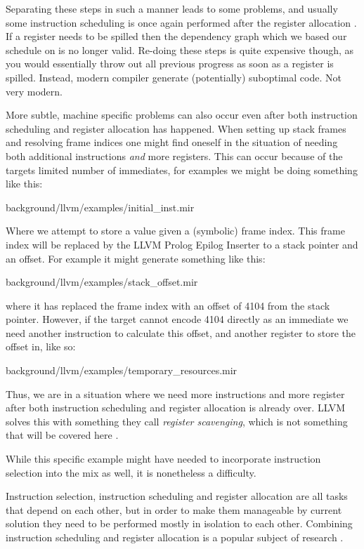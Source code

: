 Separating these steps in such a manner leads to some problems, and usually some instruction
scheduling is once again performed after the register allocation \cite{welcome-to-backend}.
If a register needs to be spilled then the dependency graph which we based our schedule on is no longer valid. Re-doing
these steps is quite expensive though, as you would essentially throw out all previous
progress as soon as a register is spilled. Instead, modern compiler generate (potentially)
suboptimal code. Not very modern.

More subtle, machine specific problems can also occur even after both instruction scheduling
and register allocation has happened. When setting up stack frames and resolving frame
indices one might find oneself in the situation of needing both additional instructions
\textit{and} more registers. This can occur because of the targets limited number of immediates,
for examples we might be doing something like this:


{background/llvm/examples/initial_inst.mir}

Where we attempt to store a value given a (symbolic) frame index. This frame index will be replaced by
the LLVM Prolog Epilog Inserter to a stack pointer and an offset. For example it might
generate something like this:


{background/llvm/examples/stack_offset.mir}

where it has replaced the frame index with an offset of 4104 from the stack pointer. However,
if the target cannot encode 4104 directly as an immediate we need another instruction to
calculate this offset, and another register to store the offset in, like so:


{background/llvm/examples/temporary_resources.mir}

Thus, we are in a situation where we need more instructions and more register after both
instruction scheduling and register allocation is already over. LLVM solves this with something
they call \textit{register scavenging}, which is not something that will be covered here
\cite[at~48:53]{welcome-to-backend}.

While this specific example might have needed to incorporate instruction selection into
the mix as well, it is nonetheless a difficulty.

Instruction selection, instruction scheduling and register allocation are all tasks that
depend on each other, but in order to make them manageable by current solution they need
to be performed mostly in isolation to each other. Combining instruction scheduling and
register allocation is a popular subject of research
\cite{constraint-based, combining-alloc-sched, integrated-sched-alloc-techniques}.
